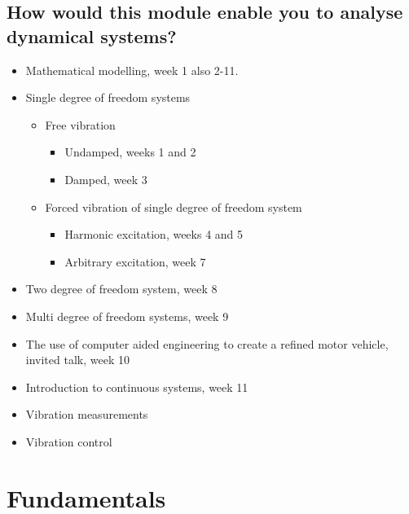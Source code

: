 \documentclass[class=report, crop=false, 12pt,a4paper]{standalone}
\begin{document}
\subsection*{How would this module enable you to analyse dynamical systems?}
\begin{itemize}
    \item Mathematical modelling, week 1 also 2-11.
    \item Single degree of freedom systems
    \begin{itemize}
        \item Free vibration
        \begin{itemize}
            \item Undamped, weeks 1 and 2
            \item Damped, week 3
        \end{itemize}
        \item Forced vibration of single degree of freedom system
        \begin{itemize}
            \item Harmonic excitation, weeks 4 and 5
            \item Arbitrary excitation, week 7
        \end{itemize}
    \end{itemize}
    \item Two degree of freedom system, week 8
    \item Multi degree of freedom systems, week 9
    \item The use of computer aided engineering to create a refined motor vehicle, invited talk, week 10
    \item Introduction to continuous systems, week 11
    \item Vibration measurements
    \item Vibration control
\end{itemize}
\section{Fundamentals}
\end{document}
